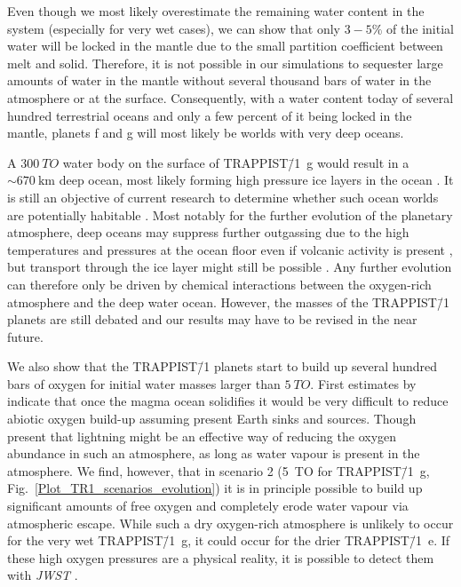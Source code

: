 \documentclass[oneside,twocolumn]{article}
\newcommand{\eg}{e.g. }
\begin{document}
Even though we most likely overestimate the remaining water content in the system (especially for very wet cases), we can show that only $3-5\%$ of the initial water will be locked in the mantle due to the small partition coefficient between melt and solid. Therefore, it is not possible in our simulations to sequester large amounts of water in the mantle without several thousand bars of water in the atmosphere or at the surface. Consequently, with a water content today of several hundred terrestrial oceans and only a few percent of it being locked in the mantle, planets f and g will most likely be worlds with very deep oceans.

A $\SI{300}{TO}$ water body on the surface of TRAPPIST\=/1~g would result in a $\sim \SI{670}{\kilo\metre}$ deep ocean, most likely forming high pressure ice layers in the ocean \citep{Dorn2018}. It is still an objective of current research to determine whether such ocean worlds are potentially habitable \citep[\eg][]{Noack2016}. Most notably for the further evolution of the planetary atmosphere, deep oceans may suppress further outgassing due to the high temperatures and pressures at the ocean floor even if volcanic activity is present \citep{Noack2016}, but transport through the ice layer might still be possible \citep{KalousovaSotin18}. Any further evolution can therefore only be driven by chemical interactions between the oxygen-rich atmosphere and the deep water ocean.
However, the masses of the TRAPPIST\=/1 planets are still debated and our results may have to be revised in the near future.

We also show that the TRAPPIST\=/1 planets start to build up several hundred bars of oxygen for initial water masses larger than $\SI{5}{TO}$. First estimates by \citet{lingam2020} indicate that once the magma ocean solidifies it would be very difficult to reduce abiotic oxygen build-up assuming present Earth sinks and sources. Though \citet{Harman2018} present that lightning might be an effective way of reducing the oxygen abundance in such an atmosphere, as long as water vapour is present in the atmosphere. We find, however, that in scenario 2 (5~TO for TRAPPIST\=/1~g, Fig.~\ref{Plot_TR1_scenarios_evolution}) it is in principle possible to build up significant amounts of free oxygen and completely erode water vapour via atmospheric escape. While such a dry oxygen-rich atmosphere is unlikely to occur for the very wet TRAPPIST\=/1~g, it could occur for the drier TRAPPIST\=/1~e. If these high oxygen pressures are a physical reality, it is possible to detect them with \textit{JWST} \citep{Lincowski2018}.
\end{document}

